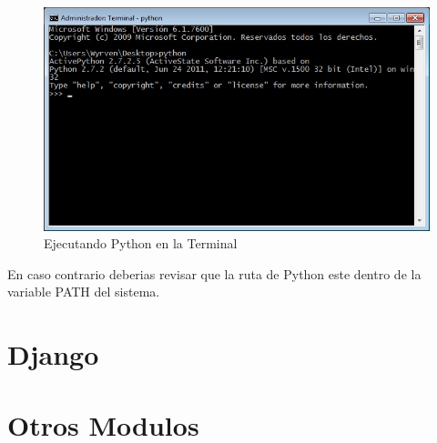 \begin{figure}[h]
    \centering
    \includegraphics[scale=0.7]{resourse/consola-python.jpg}
    \caption{Ejecutando Python en la Terminal}
    \label{fig:ejemplo}
\end{figure}    

En caso contrario deberias revisar que la ruta de Python este dentro de la variable
 PATH del sistema.


\section{Django}

\section{Otros Modulos}


